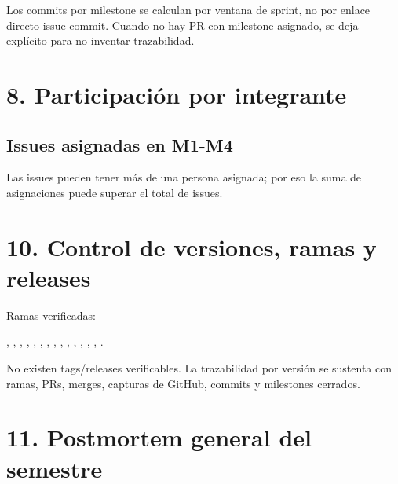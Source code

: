 \documentclass[11pt,a4paper]{article}
\begin{document}
Los commits por milestone se calculan por ventana de sprint, no por enlace directo issue-commit. Cuando no hay PR con milestone asignado, se deja explícito para no inventar trazabilidad.

\section{8. Participación por integrante}

\subsection{Issues asignadas en M1-M4}

Las issues pueden tener más de una persona asignada; por eso la suma de asignaciones puede superar el total de issues.


\section{10. Control de versiones, ramas y releases}

Ramas verificadas:

\texttt{}, \texttt{}, \texttt{}, \texttt{}, \texttt{}, \texttt{}, \texttt{}, \texttt{}, \texttt{}, \texttt{}, \texttt{}, \texttt{}, \texttt{}, \texttt{}, \texttt{}.

No existen tags/releases verificables. La trazabilidad por versión se sustenta con ramas, PRs, merges, capturas de GitHub, commits y milestones cerrados.

\section{11. Postmortem general del semestre}
\end{document}
